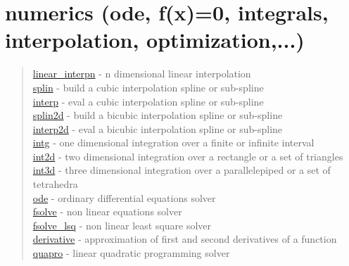 \chapter*{numerics (ode, f(x)=0, integrals, interpolation,
  optimization,...)}


\begin{quote}
\noindent
\hyperlink{linear_interpn}{linear\_interpn} - n dimensional linear interpolation \\
\hyperlink{splin}{splin} - build a cubic interpolation spline or sub-spline \\
\hyperlink{interp}{interp} - eval a cubic interpolation spline or sub-spline \\
\hyperlink{splin2d}{splin2d} - build a bicubic interpolation spline or sub-spline \\
\hyperlink{interp2d}{interp2d} - eval a bicubic interpolation spline or sub-spline \\
\hyperlink{intg}{intg} - one dimensional integration over a finite or infinite interval \\
\hyperlink{int2d}{int2d} - two dimensional integration over a rectangle or a set of triangles \\
 \hyperlink{int3d}{int3d} - three dimensional integration over a parallelepiped  or a set of tetrahedra \\
\hyperlink{ode}{ode} - ordinary differential equations solver \\
\hyperlink{fsolve}{fsolve} - non linear equations solver \\
\hyperlink{fsolve_lsq}{fsolve\_lsq} - non linear least square solver \\
\hyperlink{derivative}{derivative} - approximation of first and second derivatives of a function\\
\hyperlink{quapro}{quapro} - linear quadratic programming solver \\
\end{quote}



  


 
  
 
 
 
 
 
 
 
